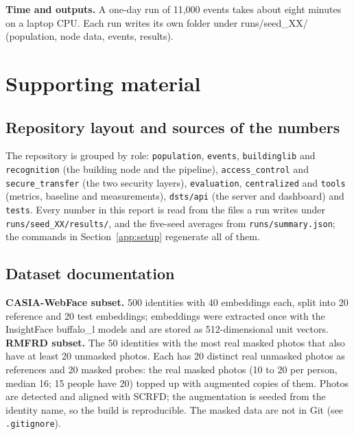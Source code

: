 \documentclass[12pt,a4paper,oneside]{report}
\begin{document}
\textbf{Time and outputs.} A one-day run of 11,000 events takes about eight minutes on a laptop CPU. Each run writes its own folder under runs/seed\_\allowbreak XX/ (population, node data, events, results).

\section{Supporting material}
\subsection{Repository layout and sources of the numbers}
The repository is grouped by role: \texttt{population}, \texttt{events}, \texttt{buildinglib} and \texttt{recognition} (the building node and the pipeline), \texttt{access\_\allowbreak control} and \texttt{secure\_\allowbreak transfer} (the two security layers), \texttt{evaluation}, \texttt{centralized} and \texttt{tools} (metrics, baseline and measurements), \texttt{dsts/api} (the server and dashboard) and \texttt{tests}. Every number in this report is read from the files a run writes under \texttt{runs/seed\_\allowbreak XX/results/}, and the five-seed averages from \texttt{runs/summary.json}; the commands in Section~\ref{app:setup} regenerate all of them.

\subsection{Dataset documentation}
\textbf{CASIA-WebFace subset.} 500 identities with 40 embeddings each, split into 20 reference and 20 test embeddings; embeddings were extracted once with the InsightFace buffalo\_\allowbreak l models and are stored as 512-dimensional unit vectors. \textbf{RMFRD subset.} The 50 identities with the most real masked photos that also have at least 20 unmasked photos. Each has 20 distinct real unmasked photos as references and 20 masked probes: the real masked photos (10 to 20 per person, median 16; 15 people have 20) topped up with augmented copies of them. Photos are detected and aligned with SCRFD; the augmentation is seeded from the identity name, so the build is reproducible. The masked data are not in Git (see \texttt{.gitignore}).
\end{document}
